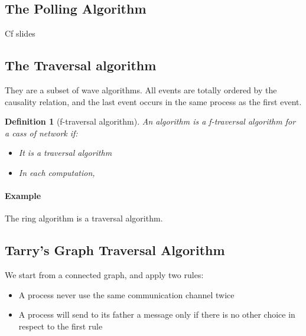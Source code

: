 \documentclass{article}
\newtheorem{defi}{Definition}
\begin{document}
\newpage
\subsection{The Polling Algorithm}
Cf slides


\subsection{The Traversal algorithm}
They are a subset of wave algorithms. All events are totally ordered by the causality relation, and the last event occurs in the same process as the first event.

\begin{defi}[f-traversal algorithm]
An algorithm is a f-traversal algorithm for a cass of network if:
\begin{itemize}[noitemsep]
\item It is a traversal algorithm
\item In each computation, 
\end{itemize}
\end{defi}

\paragraph{Example}
The ring algorithm is a traversal algorithm.

\subsection{Tarry's Graph Traversal Algorithm}
We start from a connected graph, and apply two rules:
\begin{itemize}[noitemsep]
\item A process never use the same communication channel twice 
\item A process will send to its father a message only if there is no other choice in respect to the first rule
\end{itemize}

\begin{algorithm}
\end{algorithm}
\end{document}
